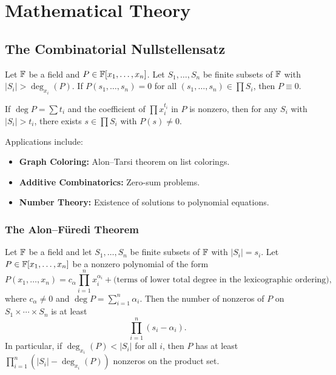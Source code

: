 \section{Mathematical Theory}

\subsection{The Combinatorial Nullstellensatz}

\begin{theorem}
Let $\mathbb{F}$ be a field and $P \in \mathbb{F}[x_1, \ldots, x_n]$. Let $S_1, \ldots, S_n$ be finite subsets of $\mathbb{F}$ with $|S_i| > \deg_{x_i}(P)$. If $P(s_1, \ldots, s_n) = 0$ for all $(s_1, \ldots, s_n) \in \prod S_i$, then $P \equiv 0$.
\end{theorem}

\begin{corollary}
If $\deg P = \sum t_i$ and the coefficient of $\prod x_i^{t_i}$ in $P$ is nonzero, then for any $S_i$ with $|S_i| > t_i$, there exists $s \in \prod S_i$ with $P(s) \neq 0$.
\end{corollary}

Applications include:
\begin{itemize}
    \item \textbf{Graph Coloring:} Alon--Tarsi theorem on list colorings.
    \item \textbf{Additive Combinatorics:} Zero-sum problems.
    \item \textbf{Number Theory:} Existence of solutions to polynomial equations.
\end{itemize}

\subsubsection*{The Alon--F\"uredi Theorem}

\begin{theorem}
Let $\mathbb{F}$ be a field and let $S_1, \ldots, S_n$ be finite subsets of $\mathbb{F}$ with $|S_i| = s_i$. Let $P \in \mathbb{F}[x_1, \ldots, x_n]$ be a nonzero polynomial of the form
\[
P(x_1, \ldots, x_n) = c_{\alpha} \prod_{i=1}^n x_i^{\alpha_i} + \text{(terms of lower total degree in the lexicographic ordering)},
\]
where $c_\alpha \neq 0$ and $\deg P = \sum_{i=1}^n \alpha_i$. Then the number of nonzeros of $P$ on $S_1 \times \cdots \times S_n$ is at least
\[
\prod_{i=1}^n (s_i - \alpha_i).
\]
In particular, if $\deg_{x_i}(P) < |S_i|$ for all $i$, then $P$ has at least $\prod_{i=1}^n (|S_i| - \deg_{x_i}(P))$ nonzeros on the product set.
\end{theorem}

